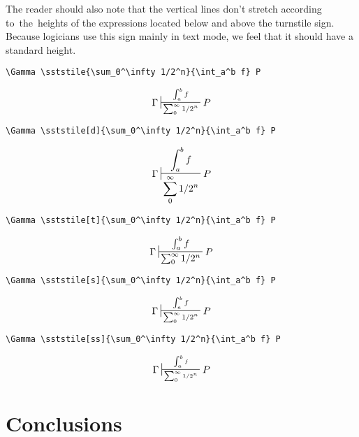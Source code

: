 \documentclass{pracjourn}
\begin{document}
The reader should also note that the vertical lines don't stretch according to~the~heights of the expressions located below and above the turnstile sign.  Because logicians use this sign mainly in text mode, we feel that it should have a standard height.

\begin{verbatim}
\Gamma \sststile{\sum_0^\infty 1/2^n}{\int_a^b f} P
\end{verbatim}
\begin{equation}\Gamma \sststile{\sum_0^\infty 1/2^n}{\int_a^b f} P\end{equation} \vspace{0.4em}

\begin{verbatim}
\Gamma \sststile[d]{\sum_0^\infty 1/2^n}{\int_a^b f} P
\end{verbatim}
\begin{equation}\Gamma \sststile[d]{\sum_0^\infty 1/2^n}{\int_a^b f} P\end{equation} \vspace{0.4em}

\begin{verbatim}
\Gamma \sststile[t]{\sum_0^\infty 1/2^n}{\int_a^b f} P
\end{verbatim}
\begin{equation}\Gamma \sststile[t]{\sum_0^\infty 1/2^n}{\int_a^b f} P\end{equation} \vspace{0.4em}

\begin{verbatim}
\Gamma \sststile[s]{\sum_0^\infty 1/2^n}{\int_a^b f} P
\end{verbatim}
\begin{equation}\Gamma \sststile[s]{\sum_0^\infty 1/2^n}{\int_a^b f} P\end{equation} \vspace{0.4em}

\begin{verbatim}
\Gamma \sststile[ss]{\sum_0^\infty 1/2^n}{\int_a^b f} P
\end{verbatim}
\begin{equation}\Gamma \sststile[ss]{\sum_0^\infty 1/2^n}{\int_a^b f} P\end{equation} \vspace{0.4em}

\section{Conclusions} %
\label{sec:conclusions}
\end{document}
